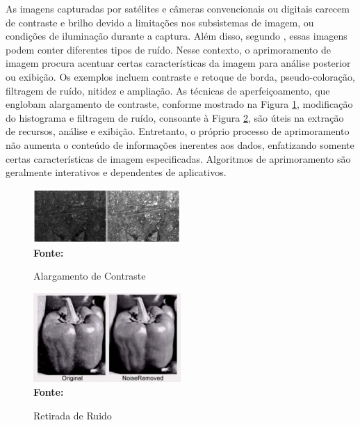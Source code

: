 As imagens capturadas por satélites e câmeras convencionais ou digitais carecem de contraste e brilho devido a limitações nos subsistemas de imagem, ou condições de iluminação durante a captura. Além disso, segundo , essas imagens podem conter diferentes tipos de ruído. Nesse contexto, o aprimoramento de imagem procura acentuar certas características da imagem para análise posterior ou exibição. Os exemplos incluem contraste e retoque de borda, pseudo-coloração, filtragem de ruído, nitidez e ampliação. As técnicas de aperfeiçoamento, que englobam alargamento de contraste, conforme mostrado na Figura \ref{fig:contraste}, modificação do histograma e filtragem de ruído, consoante à Figura \ref{fig:ruido}, são úteis na extração de recursos, análise e exibição. Entretanto, o próprio processo de aprimoramento não aumenta o conteúdo de informações inerentes aos dados, enfatizando somente certas características de imagem especificadas. Algoritmos de aprimoramento são geralmente interativos e dependentes de aplicativos.

 \begin{figure}[ht]
 	\centering	
 	\caption[\hspace{0.1cm}Grade Computacional.]{Alargamento de Contraste}
 	\vspace{-0.4cm}
 	\includegraphics[width=0.5\textwidth]{figuras/Alargamento de Contraste.png}
 	\captionsetup{justification=centering}
	\vspace{-0.2cm}
	\\\textbf{\footnotesize Fonte: \cite{techniques} }
	\label{fig:contraste}
\end{figure}

 \begin{figure}[ht]
 	\centering	
 	\caption[\hspace{0.1cm}Grade Computacional.]{Retirada de Ruido}
 	\vspace{-0.4cm}
 	\includegraphics[width=0.5\textwidth]{figuras/Retirada de Ruido.png}
 	\captionsetup{justification=centering}
	\vspace{-0.2cm}
	\\\textbf{\footnotesize Fonte: \cite{techniques} }
	\label{fig:ruido}
\end{figure}



